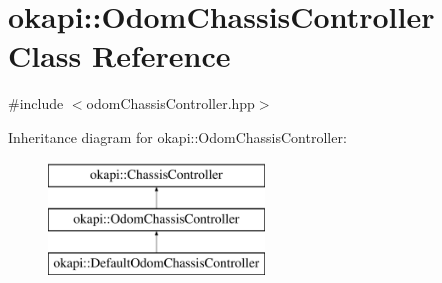 \hypertarget{classokapi_1_1OdomChassisController}{}\section{okapi\+::Odom\+Chassis\+Controller Class Reference}
\label{classokapi_1_1OdomChassisController}


{\ttfamily \#include $<$odom\+Chassis\+Controller.\+hpp$>$}

Inheritance diagram for okapi\+::Odom\+Chassis\+Controller\+:\begin{figure}[H]
\begin{center}
\leavevmode
\includegraphics[height=3.000000cm]{classokapi_1_1OdomChassisController}
\end{center}
\end{figure}
